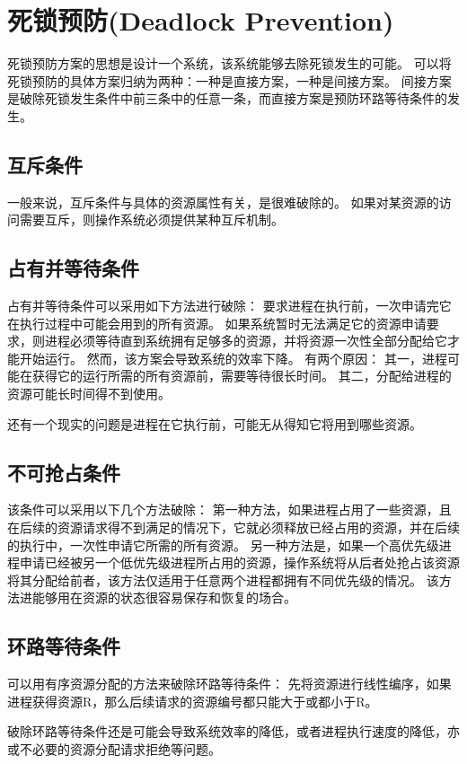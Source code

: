 
\section{死锁预防(Deadlock Prevention)}
{
    死锁预防方案的思想是设计一个系统，该系统能够去除死锁发生的可能。
    可以将死锁预防的具体方案归纳为两种：一种是直接方案，一种是间接方案。
    间接方案是破除死锁发生条件中前三条中的任意一条，而直接方案是预防环路等待条件的发生。

    \subsection{互斥条件}
    {
        一般来说，互斥条件与具体的资源属性有关，是很难破除的。
        如果对某资源的访问需要互斥，则操作系统必须提供某种互斥机制。
    }

    \subsection{占有并等待条件}
    {
        占有并等待条件可以采用如下方法进行破除：
        要求进程在执行前，一次申请完它在执行过程中可能会用到的所有资源。
        如果系统暂时无法满足它的资源申请要求，则进程必须等待直到系统拥有足够多的资源，并将资源一次性全部分配给它才能开始运行。
        然而，该方案会导致系统的效率下降。
        有两个原因：
        其一，进程可能在获得它的运行所需的所有资源前，需要等待很长时间。
        其二，分配给进程的资源可能长时间得不到使用。

        还有一个现实的问题是进程在它执行前，可能无从得知它将用到哪些资源。
    }

    \subsection{不可抢占条件}
    {
        该条件可以采用以下几个方法破除：
        第一种方法，如果进程占用了一些资源，且在后续的资源请求得不到满足的情况下，它就必须释放已经占用的资源，并在后续的执行中，一次性申请它所需的所有资源。
        另一种方法是，如果一个高优先级进程申请已经被另一个低优先级进程所占用的资源，操作系统将从后者处抢占该资源将其分配给前者，该方法仅适用于任意两个进程都拥有不同优先级的情况。
        该方法进能够用在资源的状态很容易保存和恢复的场合。
    }

    \subsection{环路等待条件}
    {
        可以用有序资源分配的方法来破除环路等待条件：
        先将资源进行线性编序，如果进程获得资源R，那么后续请求的资源编号都只能大于或都小于R。

        破除环路等待条件还是可能会导致系统效率的降低，或者进程执行速度的降低，亦或不必要的资源分配请求拒绝等问题。
    }
}
